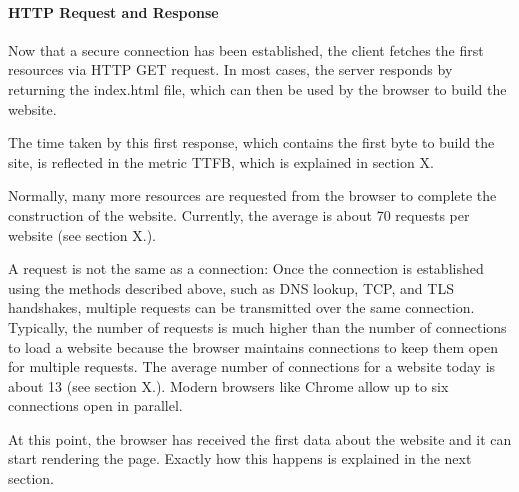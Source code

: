 



\paragraph{HTTP Request and Response} %

Now that a secure connection has been established, the client fetches the first resources via HTTP GET request.
In most cases, the server responds by returning the index.html file, which can then be used by the browser to build the website. %

The time taken by this first response, which contains the first byte to build the site, is reflected in the metric TTFB, which is explained in section X.



Normally, many more resources are requested from the browser to complete the construction of the website.
Currently, the average is about 70 requests per website (see section X.). %

A request is not the same as a connection:
Once the connection is established using the methods described above, such as DNS lookup, TCP, and TLS handshakes, multiple requests can be transmitted over the same connection.
Typically, the number of requests is much higher than the number of connections to load a website because the browser maintains connections to keep them open for multiple requests.
The average number of connections for a website today is about 13 (see section X.). %
Modern browsers like Chrome allow up to six connections open in parallel. %



At this point, the browser has received the first data about the website and it can start rendering the page.
Exactly how this happens is explained in the next section.







